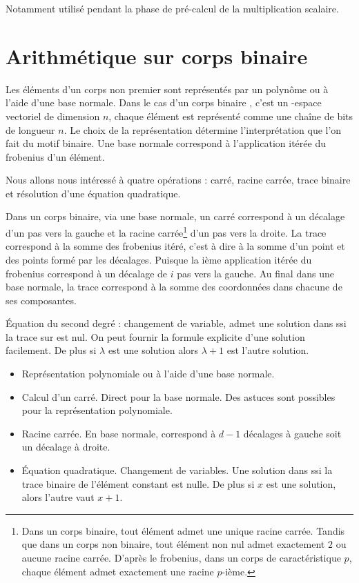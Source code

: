 Notamment utilisé pendant la phase de pré-calcul de la multiplication scalaire.


\section{Arithmétique sur corps binaire}
Les éléments d'un corps non premier sont représentés par un polynôme ou à l'aide d'une base normale. Dans le cas d'un corps binaire , c'est un -espace vectoriel de dimension $n$, chaque élément est représenté comme une chaîne de bits de longueur $n$. Le choix de la représentation détermine l'interprétation que l'on fait du motif binaire. Une base normale correspond à l'application itérée du frobenius d'un élément. 

Nous allons nous intéressé à quatre opérations : carré, racine carrée, trace binaire et résolution d'une équation quadratique. 

Dans un corps binaire, via une base normale, un carré correspond à un décalage d'un pas vers la gauche et la racine carrée\footnote{Dans un corps binaire, tout élément admet une unique racine carrée. Tandis que dans un corps non binaire, tout élément non nul admet exactement $2$ ou aucune racine carrée. D'après le frobenius, dans un corps de caractéristique $p$, chaque élément admet exactement une racine $p$-ième.} d'un pas vers la droite. La trace correspond à la somme des frobenius itéré, c'est à dire à la somme d'un point et des points formé par les décalages. Puisque la ième application itérée du frobenius correspond à un décalage de $i$ pas vers la gauche. Au final dans une base normale, la trace correspond à la somme des coordonnées dans chacune de ses composantes.

\'Equation du second degré : changement de variable, admet une solution dans  ssi la trace sur  est nul. On peut fournir la formule explicite d'une solution facilement. De plus si $\lambda$ est une solution alors $\lambda + 1$ est l'autre solution.
\begin{itemize}
    \item Représentation polynomiale ou à l'aide d'une base normale.
    \item Calcul d'un carré. Direct pour la base normale. Des astuces sont possibles pour la représentation polynomiale.
    \item Racine carrée. En base normale, correspond à $d-1$ décalages à gauche soit un décalage à droite.
    \item \'Equation quadratique. Changement de variables. Une solution dans  ssi la trace binaire de l'élément constant est nulle. De plus si $x$ est une solution, alors l'autre vaut $x + 1$.
\end{itemize}
